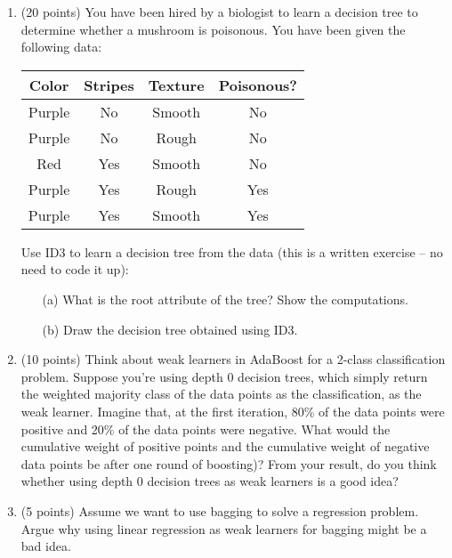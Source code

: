 \documentclass[11pt]{article}
\begin{document}
\begin{enumerate}
\item (20 points)
You have been hired by a biologist to learn a decision tree to determine whether a mushroom is poisonous. You have been given the following data:

\vspace{-7pt}
\begin{center}
\begin{tabular}{| c | c | c | c |}
    \hline
    Color & Stripes & Texture & Poisonous? \\
    \hline
    Purple  & No    & Smooth    & No \\
    Purple  & No    & Rough     & No \\
    Red     & Yes   & Smooth    & No \\
    Purple  & Yes   & Rough     & Yes \\
    Purple  & Yes   & Smooth    & Yes \\
    \hline
\end{tabular}
\end{center}
\vspace{-7pt}

Use ID3 to learn a decision tree from the data (this is a written exercise -- no need to code it up):
\begin{itemize}
    \item[(a)] What is the root attribute of the tree? Show the computations.
    \item[(b)] Draw the decision tree obtained using ID3.
\end{itemize}

\item (10 points)
Think about weak learners in AdaBoost for a 2-class classification problem.
Suppose you're using depth 0 decision trees, which
  simply return the weighted majority class of the data points as the
  classification, as the weak learner. 
  Imagine that, at the first iteration, 80\% of the data points were positive 
  and 20\% of the data points were negative.
  What would the cumulative weight of positive points and the cumulative weight of negative data points be after one round of boosting)?
  From your result, do you think whether using
  depth 0 decision trees as weak learners is a good idea?

\item (5 points)
Assume we want to use bagging to solve a regression problem. 
Argue why using linear regression as weak learners for bagging might be a bad idea.



\end{enumerate}
\end{document}
